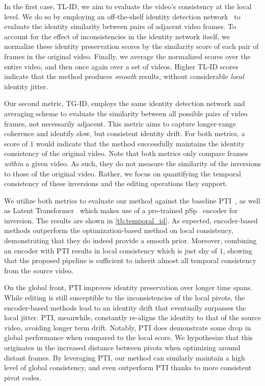 In the first case, TL-ID, we aim to evaluate the video's consistency at the local level. We do so by employing an off-the-shelf identity detection network~\cite{deng2019arcface} to evaluate the identity similarity between pairs of adjacent video frames. To account for the effect of inconsistencies in the identity network itself, we normalize these identity preservation scores by the similarity score of each pair of frames in the original video. Finally, we average the normalized scores over the entire video, and then once again over a set of videos.
Higher TL-ID scores indicate that the method produces \textit{smooth} results, without considerable \textit{local} identity jitter. 


Our second metric, TG-ID, employs the same identity detection network and averaging scheme to evaluate the similarity between all possible pairs of video frames, not necessarily adjacent. This metric aims to capture longer-range coherence and identify slow, but consistent identity drift.
For both metrics, a score of $1$ would indicate that the method successfully maintains the identity consistency of the original video.
Note that both metrics only compare frames \textit{within} a given video. As such, they do not measure the similarity of the inversions to those of the original video. Rather, we focus on quantifying the temporal consistency of these inversions and the editing operations they support.

We utilize both metrics to evaluate our method against the baseline PTI~\cite{roich2021pivotal}, as well as Latent Transformer~\cite{yao2021latent} which makes use of a pre-trained pSp~\cite{richardson2020encoding} encoder for inversion. The results are shown in \cref{tb:temporal_id}. As expected, encoder-based methods outperform the optimization-based method on local consistency, demonstrating that they do indeed provide a smooth prior. Moreover, combining an encoder with PTI results in local consistency which is just shy of $1$, showing that the proposed pipeline is sufficient to inherit almost all temporal consistency from the source video.


On the global front, PTI improves identity preservation over longer time spans. While editing is still susceptible to the inconsistencies of the local pivots, the encoder-based methods lead to an identity drift that eventually surpasses the local jitter. PTI, meanwhile, constantly re-aligns the identity to that of the source video, avoiding longer term drift. Notably, PTI does demonstrate some drop in global performance when compared to the local score. We hypothesize that this originates in the increased distance between pivots when optimizing around distant frames.
By leveraging PTI, our method can similarly maintain a high level of global consistency, and even outperform PTI thanks to more consistent pivot codes.

